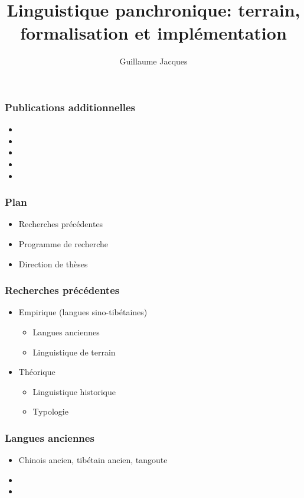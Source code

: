 \documentclass[xcolor=table]{beamer}
\begin{document}
 \title{Linguistique panchronique: terrain, formalisation et implémentation}
 \author{Guillaume Jacques}
 \date{}
 \maketitle


 \begin{frame} 
 \frametitle{Publications additionnelles}
 
   \small
\begin{itemize}
\item  {}  
\item  {}  
\item  {}
\item  {}
\item  {}
\end{itemize}
 \end{frame}
 
    \begin{frame} 
 \frametitle{Plan} 
 
 \begin{itemize}
\item  Recherches précédentes
\item  Programme de recherche
\item  Direction de thèses
\end{itemize}
   \end{frame} 
 
 
   \begin{frame} 
 \frametitle{Recherches précédentes} 
 \begin{itemize}%
\item   Empirique (langues sino-tibétaines)
\begin{itemize}
\item Langues anciennes
\item Linguistique de terrain 
\end{itemize}
\item   Théorique
\begin{itemize}
\item Linguistique historique
\item Typologie
\end{itemize}
\end{itemize}
   \end{frame} 
   
   \begin{frame} 
 \frametitle{Langues anciennes} 
 \begin{itemize}%
\item Chinois ancien, tibétain ancien, tangoute
\item {}  
\item {}  
\end{itemize}
   \end{frame} 
   
\end{document}

